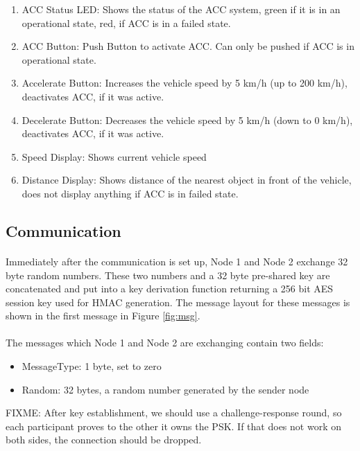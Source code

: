 \begin{enumerate}
  \item ACC Status LED: Shows the status of the ACC system, green if it is in an operational state, red, if ACC  is in a failed state.
  \item ACC Button: Push Button to activate ACC. Can only be pushed if ACC is in operational state.
  \item Accelerate Button: Increases the vehicle speed by 5 km/h (up to 200 km/h), deactivates ACC, if it was active.
  \item Decelerate Button: Decreases the vehicle speed by 5 km/h (down to 0 km/h), deactivates ACC, if it was active.
  \item Speed Display: Shows current vehicle speed
  \item Distance Display: Shows distance of the nearest object in front of the vehicle, does not display anything if ACC is in failed state.
\end{enumerate}

\subsection{Communication}

\paragraph{} Immediately after the communication is set up, Node 1 and Node 2 exchange 32 byte random numbers. These two numbers and a 32 byte pre-shared key are concatenated and put into a key derivation function returning a 256 bit AES session key used for HMAC generation. The message layout for these messages is shown in the first message in Figure \ref{fig:msg}.

\paragraph{}The messages which Node 1 and Node 2 are exchanging contain two fields:
\begin{itemize}
	\item MessageType: 1 byte, set to zero
	\item Random: 32 bytes, a random number generated by the sender node
\end{itemize}

FIXME: After key establishment, we should use a challenge-response round, so each participant proves to the other it owns the PSK. If that does not work on both sides, the connection should be dropped.

